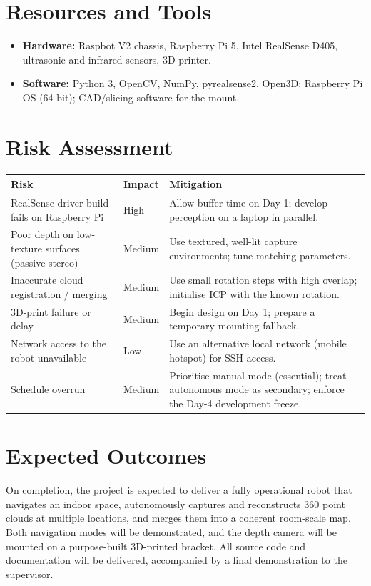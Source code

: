 \documentclass[11pt,a4paper]{article}
\begin{document}
\section{Resources and Tools}
\begin{itemize}
\item \textbf{Hardware:} Raspbot V2 chassis, Raspberry Pi 5, Intel RealSense D405, ultrasonic and infrared sensors, 3D printer.
\item \textbf{Software:} Python 3, OpenCV, NumPy, pyrealsense2, Open3D; Raspberry Pi OS (64-bit); CAD/slicing software for the mount.
\end{itemize}

\section{Risk Assessment}
\begin{center}
\small
\begin{tabularx}{\linewidth}{@{}p{4.3cm}p{1.7cm}X@{}}
\toprule
\textbf{Risk} & \textbf{Impact} & \textbf{Mitigation}\\
\midrule
\rowcolor{rowgray} RealSense driver build fails on Raspberry Pi & High & Allow buffer time on Day 1; develop perception on a laptop in parallel.\\
Poor depth on low-texture surfaces (passive stereo) & Medium & Use textured, well-lit capture environments; tune matching parameters.\\
\rowcolor{rowgray} Inaccurate cloud registration / merging & Medium & Use small rotation steps with high overlap; initialise ICP with the known rotation.\\
3D-print failure or delay & Medium & Begin design on Day 1; prepare a temporary mounting fallback.\\
\rowcolor{rowgray} Network access to the robot unavailable & Low & Use an alternative local network (mobile hotspot) for SSH access.\\
Schedule overrun & Medium & Prioritise manual mode (essential); treat autonomous mode as secondary; enforce the Day-4 development freeze.\\
\bottomrule
\end{tabularx}
\end{center}

\section{Expected Outcomes}
On completion, the project is expected to deliver a fully operational robot that navigates an indoor
space, autonomously captures and reconstructs 360\textdegree{} point clouds at multiple locations, and
merges them into a coherent room-scale map. Both navigation modes will be demonstrated, and the depth
camera will be mounted on a purpose-built 3D-printed bracket. All source code and documentation will
be delivered, accompanied by a final demonstration to the supervisor.
\end{document}
